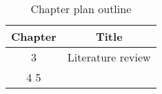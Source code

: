 \begin{table}[h!]
\centering
\begin{tabular}{cc}
{Chapter} & {Title} \\ \midrule
{3} & {Literature review} \\
{4}
{5}
{
\end{tabular}
\caption{Chapter plan outline}
\label{table:1}
\end{table}